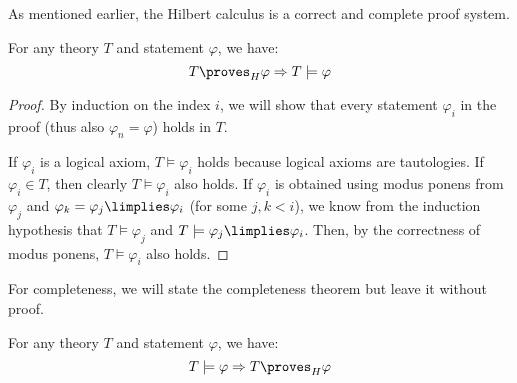 As mentioned earlier, the Hilbert calculus is a correct and complete proof system.

\begin{theorem}
For any theory $T$ and statement $\varphi$, we have: 
$$
T \proves_H \varphi \Rightarrow T \models \varphi
$$ 
\end{theorem}
\begin{proof}
By induction on the index $i$, we will show that every statement $\varphi_i$ in the proof (thus also $\varphi_n = \varphi$) holds in $T$.

If $\varphi_i$ is a logical axiom, $T \models \varphi_i$ holds because logical axioms are tautologies. If $\varphi_i \in T$, then clearly $T \models \varphi_i$ also holds. If $\varphi_i$ is obtained using modus ponens from $\varphi_j$ and $\varphi_k = \varphi_j \limplies \varphi_i$ (for some $j, k < i$), we know from the induction hypothesis that $T \models \varphi_j$ and $T \models \varphi_j \limplies \varphi_i$. Then, by the correctness of modus ponens, $T \models \varphi_i$ also holds.
\end{proof}

For completeness, we will state the completeness theorem but leave it without proof.

\begin{theorem}
For any theory $T$ and statement $\varphi$, we have: 
$$
T \models \varphi \Rightarrow T \proves_H \varphi
$$
\end{theorem}
